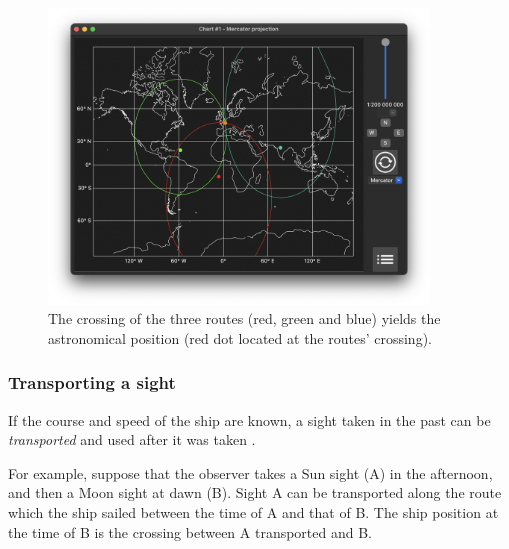 \documentclass{ol-softwaremanual}
\begin{document}
\begin{figure}
  \centering
  \includegraphics[width=0.9\textwidth]{figures/astronomical-position-mercator.png}
  \caption{
    \label{fig-astronomical-position}
    The crossing of the three routes (red, green and blue) yields the astronomical position (red dot located at the routes' crossing).  
  }
\end{figure}


\subsubsection{Transporting a sight}\label{section-transporting-sight}

If the course and speed of the ship are known, a sight taken in the past can be \textit{transported} and used after it was taken \cite{bowditch2002the,noauthor2017cours}. 

For example, suppose that the observer takes a Sun sight (A) in the afternoon, and then a Moon sight at dawn (B). Sight A can be transported along the route which the ship sailed between the time of A and that of B. The ship position at the time of B is the crossing between A transported and B. 
\end{document}
